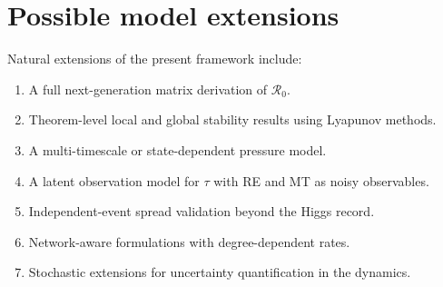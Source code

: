 \documentclass[11pt]{article}
\begin{document}
\section{Possible model extensions}
\label{app:extensions}

Natural extensions of the present framework include:
\begin{enumerate}[leftmargin=1.5em]
    \item A full next-generation matrix derivation of $\mathcal{R}_0$.
    \item Theorem-level local and global stability results using Lyapunov methods.
    \item A multi-timescale or state-dependent pressure model.
    \item A latent observation model for $\tau$ with RE and MT as noisy observables.
    \item Independent-event spread validation beyond the Higgs record.
    \item Network-aware formulations with degree-dependent rates.
    \item Stochastic extensions for uncertainty quantification in the dynamics.
\end{enumerate}
\end{document}
